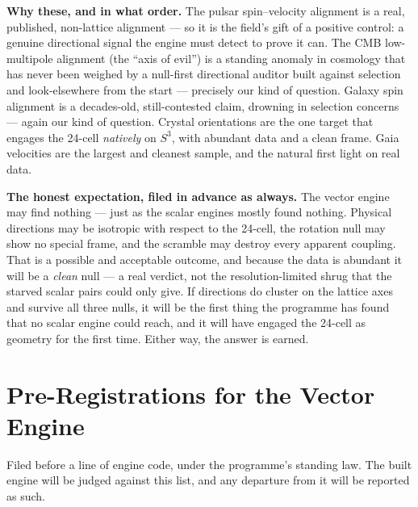 \documentclass[11pt, letterpaper, openany]{book}
\begin{document}
\begin{geobox}
\textbf{Why these, and in what order.} The pulsar spin--velocity alignment is a real, published,
non-lattice alignment --- so it is the field's gift of a positive control: a genuine directional signal the
engine must detect to prove it can. The CMB low-multipole alignment (the ``axis of evil'') is a standing
anomaly in cosmology that has never been weighed by a null-first directional auditor built against selection
and look-elsewhere from the start --- precisely our kind of question. Galaxy spin alignment is a decades-old,
still-contested claim, drowning in selection concerns --- again our kind of question. Crystal orientations are
the one target that engages the 24-cell \emph{natively} on $S^3$, with abundant data and a clean frame. Gaia
velocities are the largest and cleanest sample, and the natural first light on real data.
\end{geobox}

\begin{warningbox}
\textbf{The honest expectation, filed in advance as always.} The vector engine may find nothing --- just as
the scalar engines mostly found nothing. Physical directions may be isotropic with respect to the 24-cell, the
rotation null may show no special frame, and the scramble may destroy every apparent coupling. That is a
possible and acceptable outcome, and because the data is abundant it will be a \emph{clean} null --- a real
verdict, not the resolution-limited shrug that the starved scalar pairs could only give. If directions do
cluster on the lattice axes and survive all three nulls, it will be the first thing the programme has found
that no scalar engine could reach, and it will have engaged the 24-cell as geometry for the first time. Either
way, the answer is earned.
\end{warningbox}

\chapter{Pre-Registrations for the Vector Engine}

Filed before a line of engine code, under the programme's standing law. The built engine will be judged
against this list, and any departure from it will be reported as such.
\end{document}
